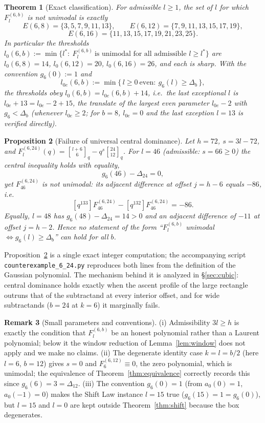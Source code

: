 \documentclass[11pt,reqno]{article}
\newtheorem{theorem}{Theorem}
\newtheorem{proposition}[theorem]{Proposition}
\theoremstyle{definition}
\newtheorem{remark}[theorem]{Remark}
\newcommand{\ggbrack}[2]{\genfrac{[}{]}{0pt}{}{#1}{#2}_q}
\begin{document}
\begin{theorem}[Exact classification]\label{thm:classification}
For admissible $l\ge 1$, the set of $l$ for which $F^{(6,b)}_l$ is not unimodal is exactly
\[
E(6,8)=\{3,5,7,9,11,13\},\qquad E(6,12)=\{7,9,11,13,15,17,19\},
\]
\[
E(6,16)=\{11,13,15,17,19,21,23,25\}.
\]
In particular the thresholds $l_0(6,b):=\min\{l^\ast:\ F^{(6,b)}_l\ \text{is unimodal for all admissible } l\ge l^\ast\}$ are $l_0(6,8)=14$, $l_0(6,12)=20$, $l_0(6,16)=26$, and each is sharp. With the convention $g_6(0):=1$ and
\[
l_{0e}(6,b):=\min\{\,l\ge 0\ \text{even}:\ g_6(l)\ge\Delta_b\,\},
\]
the thresholds obey $l_0(6,b)=l_{0e}(6,b)+14$, i.e.\ the last exceptional $l$ is $l_{0e}+13=l_{0e}-2+15$, the translate of the largest even parameter $l_{0e}-2$ with $g_6<\Delta_b$ (whenever $l_{0e}\ge 2$; for $b=8$, $l_{0e}=0$ and the last exception $l=13$ is verified directly).
\end{theorem}

\begin{proposition}[Failure of universal central dominance]\label{prop:ce}
Let $h=72$, $s=3l-72$, and $F^{(6,24)}_l(q)=\ggbrack{l+6}{6}-q^{s}\ggbrack{24}{12}$. For $l=46$ (admissible: $s=66\ge0$) the central inequality holds with equality,
\[
g_6(46)-\Delta_{24}=0,
\]
yet $F^{(6,24)}_{46}$ is not unimodal: its adjacent difference at offset $j=h-6$ equals $-86$, i.e.\
\[
[q^{133}]F^{(6,24)}_{46}-[q^{132}]F^{(6,24)}_{46}=-86 .
\]
Equally, $l=48$ has $g_6(48)-\Delta_{24}=14>0$ and an adjacent difference of $-11$ at offset $j=h-2$. Hence no statement of the form ``$F^{(6,b)}_l$ unimodal $\Leftrightarrow g_6(l)\ge\Delta_b$'' can hold for all $b$.
\end{proposition}

Proposition~\ref{prop:ce} is a single exact integer computation; the accompanying script \texttt{counter\allowbreak example\_6\_24.py} reproduces both lines from the definition of the Gaussian polynomial. The mechanism behind it is analyzed in \S\ref{sec:cubic}: central dominance holds exactly when the ascent profile of the large rectangle outruns that of the subtractand at every interior offset, and for wide subtractands ($b=24$ at $k=6$) it marginally fails.

\begin{remark}[Small parameters and conventions]\label{rem:conventions}
(i) Admissibility $3l\ge h$ is exactly the condition that $F^{(6,b)}_l$ be an honest polynomial rather than a Laurent polynomial; below it the window reduction of Lemma~\ref{lem:window} does not apply and we make no claims.
(ii) The degenerate identity case $k=l=b/2$ (here $l=6$, $b=12$) gives $s=0$ and $F^{(6,12)}_6\equiv 0$, the zero polynomial, which is unimodal; the equivalence of Theorem~\ref{thm:equivalence} correctly records this since $g_6(6)=3=\Delta_{12}$.
(iii) The convention $g_6(0)=1$ (from $a_0(0)=1$, $a_0(-1)=0$) makes the Shift Law instance $l=15$ true ($g_6(15)=1=g_6(0)$), but $l=15$ and $l=0$ are kept outside Theorem~\ref{thm:shift} because the box degenerates.
\end{remark}
\end{document}
